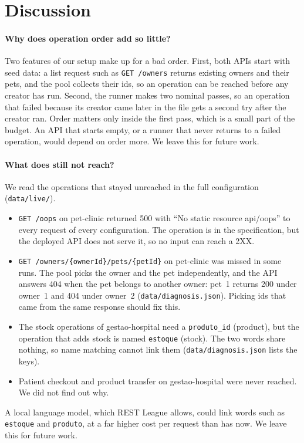 \section{Discussion}
\label{sec:discussion}

\paragraph{Why does operation order add so little?} Two features of our
setup make up for a bad order. First, both APIs start with seed data: a list
request such as \texttt{GET /owners} returns existing owners and their pets,
and the pool collects their ids, so an operation can be reached before any
creator has run. Second, the runner makes two nominal passes, so an operation
that failed because its creator came later in the file gets a second try
after the creator ran. Order matters only inside the first pass, which is a
small part of the budget. An API that starts empty, or a runner that never
returns to a failed operation, would depend on order more. We leave this for
future work.

\paragraph{What does \tool still not reach?} We read the operations that
stayed unreached in the full configuration (\texttt{data/live/}).
\begin{itemize}
  \item \texttt{GET /oops} on pet-clinic returned 500 with ``No static
    resource api/oops'' to every request of every configuration. The
    operation is in the specification, but the deployed API does not serve
    it, so no input can reach a 2XX.
  \item \texttt{GET /owners/\{ownerId\}/pets/\{petId\}} on pet-clinic was
    missed in some runs. The pool picks the owner and the pet independently,
    and the API answers 404 when the pet belongs to another owner: pet~1
    returns 200 under owner~1 and 404 under owner~2
    (\texttt{data/diagnosis.json}). Picking ids that came from the same
    response should fix this.
  \item The stock operations of gestao-hospital need a
    \texttt{produto\_id} (product), but the operation that adds stock is
    named \texttt{estoque} (stock). The two words share nothing, so name
    matching cannot link them (\texttt{data/diagnosis.json} lists the keys).
  \item Patient checkout and product transfer on gestao-hospital were never
    reached. We did not find out why.
\end{itemize}
A local language model, which REST League allows, could link words such as
\texttt{estoque} and \texttt{produto}, at a far higher cost per request than
\tool has now. We leave this for future work.

